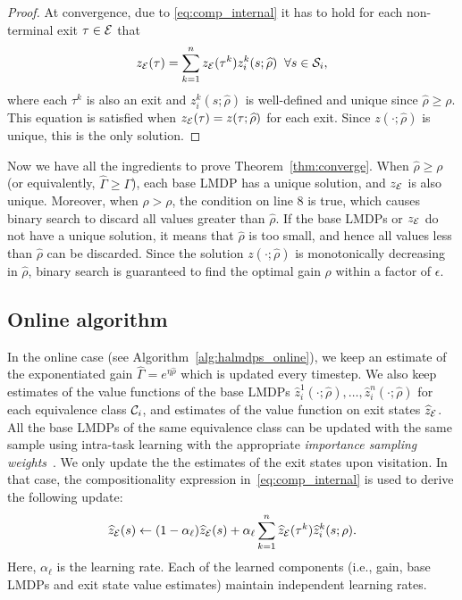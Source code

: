 \begin{proof}
At convergence, due to \eqref{eq:comp_internal} it has to hold for each non-terminal exit $\tau\in\mathcal{E}$ that
\[
  z_{\mathcal{E}}(\tau) = \sum_{k=1}^n z_{\mathcal{E}}(\tau^k) z_i^k(s;\widehat\rho)\;\;\forall s\in\mathcal{S}_i,
\]
where each $\tau^k$ is also an exit and $z_i^k(s;\widehat\rho)$ is well-defined and unique since $\widehat\rho\geq\rho$. This equation is satisfied when $z_{\mathcal{E}}(\tau)=z(\tau;\widehat\rho)$ for each exit. Since $z(\cdot;\widehat\rho)$ is unique, this is the only solution.
\end{proof}

Now we have all the ingredients to prove Theorem~\ref{thm:converge}. When $\widehat\rho\geq\rho$ (or equivalently, $\widehat\Gamma\geq\Gamma$), each base LMDP has a unique solution, and $z_{\mathcal{E}}$ is also unique. Moreover, when $\widehat\rho>\rho$, the condition on line 8 is true, which causes binary search to discard all values greater than $\widehat\rho$. If the base LMDPs or $z_{\mathcal{E}}$ do not have a unique solution, it means that $\widehat\rho$ is too small, and hence all values less than $\widehat\rho$ can be discarded. Since the solution $z(\cdot;\widehat\rho)$ is monotonically decreasing in $\widehat\rho$, binary search is guaranteed to find the optimal gain $\rho$ within a factor of $\epsilon$.

\subsection{Online algorithm}
 In the online case (see Algorithm~\ref{alg:halmdps_online}), we keep an estimate of the exponentiated gain $\widehat\Gamma=e^{\eta\widehat\rho}$ which is updated every timestep. We also keep estimates of the value functions of the base LMDPs $\widehat z_i^1(\cdot;\widehat\rho),\ldots,\widehat z_i^n(\cdot;\widehat\rho)$ for each equivalence class $\mathcal{C}_i$, and estimates of the value function on exit states $\widehat z_{\mathcal{E}}$.  All the base LMDPs of the same equivalence class can be updated with the same sample using intra-task learning with the appropriate {\it importance sampling weights\/}~\citep{Jonsson2016}. We only update the the estimates of the exit states upon visitation. In that case, the compositionality expression in~\eqref{eq:comp_internal} is used to derive the following update:
\begin{equation}
  \widehat z_{\mathcal{E}}(s)\gets (1-\alpha_\ell) \widehat z_{\mathcal{E}}(s) + \alpha_\ell \sum_{k=1}^n \widehat z_{\mathcal{E}}(\tau^k) \widehat z_i^k(s;\rho).
  \label{eq:halmdps_update_exit}
\end{equation}
Here, $\alpha_\ell$ is the learning rate. Each of the learned components (i.e., gain, base LMDPs and exit state value estimates) maintain independent learning rates.

